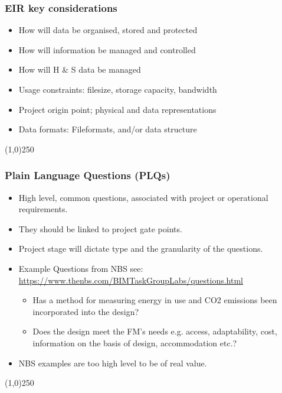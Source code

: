 \begin{frame}
\frametitle{EIR key considerations}
\begin{itemize}
	\item How will data be organised, stored and protected
	\item How will information be managed and controlled
	\item How will H \& S data be managed
	\item Usage constraints: filesize, storage capacity, bandwidth
	\item Project origin point; physical and data representations
	\item Data formats: Fileformats, and/or data structure
\end{itemize}
\end{frame}
\begin{center}\line(1,0){250}\end{center}


\begin{frame}
\frametitle{Plain Language Questions (PLQs)}
\begin{itemize}
	\item High level, common questions, associated with project or operational requirements.
	\item They should be linked to project gate points.
	\item Project stage will dictate type and the granularity of the questions.
	\item Example Questions from NBS see: \href{https://www.thenbs.com/BIMTaskGroupLabs/questions.html}{https://www.thenbs.com/BIMTaskGroupLabs/questions.html}
	\begin{itemize}
		\item Has a method for measuring energy in use and CO2 emissions been incorporated into the design?
		\item Does the design meet the FM’s needs e.g. access, adaptability, cost, information on the basis of design, accommodation etc.?
	\end{itemize}
	\item NBS examples are too high level to be of real value.	
\end{itemize}
\end{frame}
\begin{center}\line(1,0){250}\end{center}



